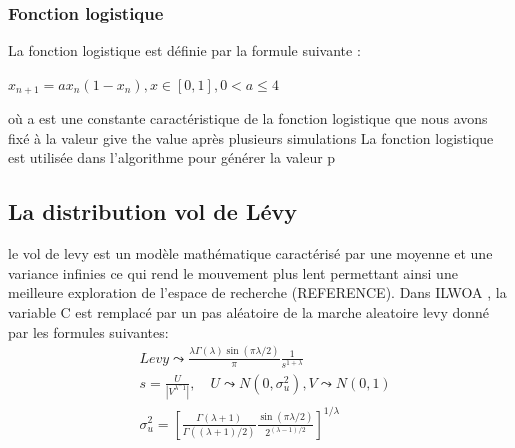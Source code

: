 \documentclass[12pt]{article}
\begin{document}
\subsubsection{Fonction logistique}
La fonction logistique est définie par la formule suivante :
\newline
\begin{center}
    $x_{n+1}=ax_n(1-x_n) ,x\in[0,1],0<a\leq4$   
\end{center}
où a est une constante caractéristique de la fonction logistique que nous avons fixé à la valeur give the value après plusieurs simulations
La fonction logistique est utilisée dans l'algorithme pour générer la valeur p
\subsection{La distribution vol de Lévy}
le vol de levy est un modèle mathématique caractérisé par une moyenne et une variance infinies ce qui rend le mouvement plus lent permettant ainsi une meilleure exploration de l'espace de recherche (REFERENCE).
Dans ILWOA , la variable C est remplacé par un pas aléatoire de la marche aleatoire levy donné par les formules suivantes:
\begin{align*}
&Levy\leadsto\frac{\lambda\Gamma(\lambda)\sin(\pi\lambda/2)}{\pi}\frac{1}{s^{1+\lambda}}\\
&s=\frac{U}{\left|{V^{\lambda^-1}}\right| },\quad U\leadsto N(0,\sigma_u^2),V\leadsto N(0,1)\\
&\sigma_u^2=[\frac{\Gamma(\lambda+1)}{\Gamma((\lambda+1)/2)}\frac{\sin(\pi\lambda/2)}{2^{(\lambda-1)/2}}]^{1/\lambda}
\end{align*}
\end{document}
